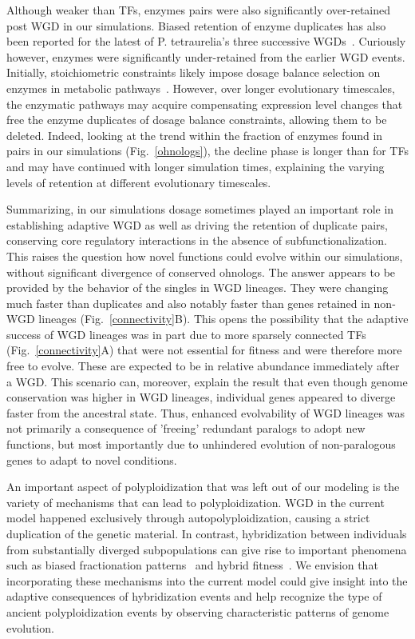 Although weaker than TFs, enzymes pairs were also significantly over-retained post WGD in our simulations. Biased retention of enzyme duplicates has also been reported for the latest of P. tetraurelia's three successive WGDs~\cite{aury_global_2006}. Curiously however, enzymes were significantly under-retained from the earlier WGD events. Initially, stoichiometric constraints likely impose dosage balance selection on enzymes in metabolic pathways~\cite{gout_differential_2009}. However, over longer evolutionary timescales, the enzymatic pathways may acquire compensating expression level changes that free the enzyme duplicates of dosage balance constraints, allowing them to be deleted. Indeed, looking at the trend within the fraction of enzymes found in pairs in our simulations (Fig.~\ref{ohnologs}), the decline phase is longer than for TFs and may have continued with longer simulation times, explaining the varying levels of retention at different evolutionary timescales.

Summarizing, in our simulations dosage sometimes played an important role in establishing adaptive WGD as well as driving the retention of duplicate pairs, conserving core regulatory interactions in the absence of subfunctionalization. This raises the question how novel functions could evolve within our simulations, without significant divergence of conserved ohnologs. The answer appears to be provided by the behavior of the singles in WGD lineages. They were changing much faster than duplicates and also notably faster than genes retained in non-WGD lineages (Fig.~\ref{connectivity}B). This opens the possibility that the adaptive success of WGD lineages was in part due to more sparsely connected TFs (Fig.~\ref{connectivity}A) that were not essential for fitness and were therefore more free to evolve. These are expected to be in relative abundance immediately after a WGD. This scenario can, moreover, explain the result that even though genome conservation was higher in WGD lineages, individual genes appeared to diverge faster from the ancestral state. Thus, enhanced evolvability of WGD lineages was not primarily a consequence of 'freeing' redundant paralogs to adopt new functions, but most importantly due to unhindered evolution of non-paralogous genes to adapt to novel conditions.

An important aspect of polyploidization that was left out of our modeling is the variety of mechanisms that can lead to polyploidization. WGD in the current model happened exclusively through autopolyploidization, causing a strict duplication of the genetic material. In contrast, hybridization between individuals from substantially diverged subpopulations can give rise to important phenomena such as biased fractionation patterns~\cite{tang_altered_2012,sankoff_model_2012} and hybrid fitness~\cite{ten_tusscher_role_2009,buggs_transcriptomic_2011}. We envision that incorporating these mechanisms into the current model could give insight into the adaptive consequences of hybridization events and help recognize the type of ancient polyploidization events by observing characteristic patterns of genome evolution. 

